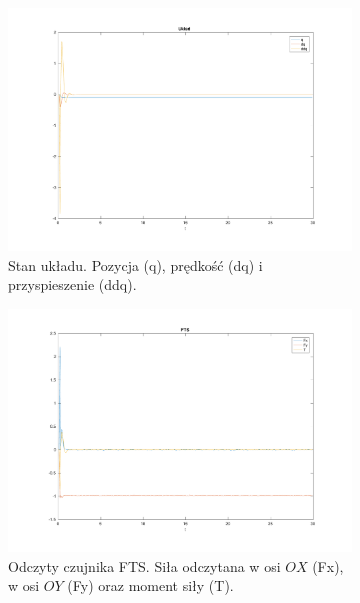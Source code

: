 \documentclass[a4paper, 10pt]{article}
\begin{document}
\begin{figure}
	\centering
	\begin{subfigure}{.5\textwidth}
		\centering
		\includegraphics[width=\linewidth]{mala_p}
		\caption{Stan układu. Pozycja (q), prędkość (dq) i przyspieszenie (ddq).}
		\label{fig:mala_p}
	\end{subfigure}%
	\begin{subfigure}{.5\textwidth}
		\centering
		\includegraphics[width=\linewidth]{mala_s}
		\caption{Odczyty czujnika FTS. Siła odczytana w osi $OX$ (Fx), w osi $OY$ (Fy) oraz moment siły (T).}
		\label{fig:mala_s}
	\end{subfigure}
	\begin{subfigure}{.5\textwidth}
		\centering

\end{subfigure}
\end{figure}
\end{document}
